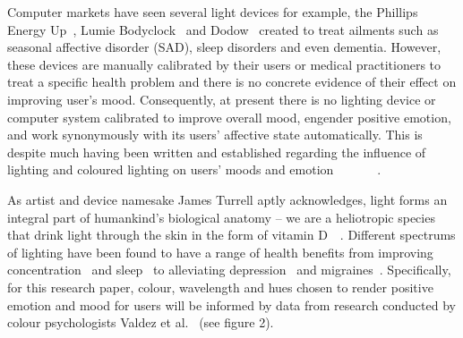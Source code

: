\documentclass{sigchi}
\begin{document}
Computer markets have seen several light devices for example, the Phillips Energy Up~\cite{Phillips01}, Lumie Bodyclock~\cite{Lumie01} and Dodow~\cite{Dodow01} created to treat ailments such as seasonal affective disorder (SAD), sleep disorders and even dementia. However, these devices are manually calibrated by their users or medical practitioners to treat a specific health problem and there is no concrete evidence of their effect on improving user’s mood. Consequently, at present there is no lighting device or computer system calibrated to improve overall mood, engender positive emotion, and work synonymously with its users’ affective state automatically. This is despite much having been written and established regarding the influence of lighting and coloured lighting on users’ moods and emotion~\cite{baron1992effects}~\cite{han2017effects}~\cite{jo2014smart}~\cite{kim2014study}~\cite{lee2019effects}~\cite{wardono2012effects}~\cite{yang2015lighting}. 

As artist and device namesake James Turrell aptly acknowledges, light forms an integral part of humankind’s biological anatomy – we are a heliotropic species that drink light through the skin in the form of vitamin D~\cite{adcock1990james}~\cite{basse2016light}. Different spectrums of lighting have been found to have a range of health benefits from improving concentration~\cite{kuller2006impact} and sleep~\cite{} to alleviating depression~\cite{kripke1998light} and migraines~\cite{Green01}. Specifically, for this research paper, colour, wavelength and hues chosen to render positive emotion and mood for users will be informed by data from research conducted by colour psychologists Valdez et al.~\cite{valdez1994effects} (see figure 2). 
\end{document}

